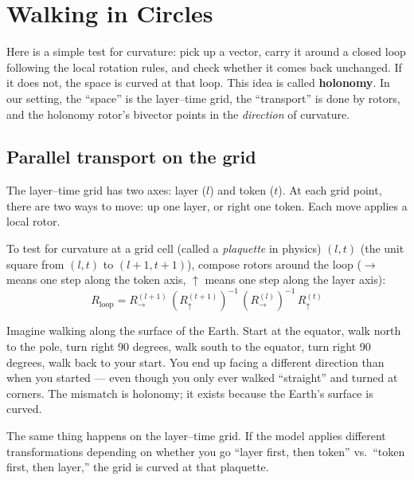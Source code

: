 \documentclass[11pt, twoside, openright]{memoir}
\newcommand{\gp}{\,}              %
\numberwithin{equation}{chapter}
\begin{document}
\chapter{Walking in Circles}
\label{chap:holonomy}

\begin{whycare}
Here is a simple test for curvature: pick up a vector, carry it around a closed loop following the local rotation rules, and check whether it comes back unchanged. If it does not, the space is curved at that loop. This idea is called \textbf{holonomy}.  In our setting, the ``space'' is the
layer--time grid, the ``transport'' is done by rotors, and the holonomy
rotor's bivector points in the \emph{direction} of curvature.
\end{whycare}

\section{Parallel transport on the grid}

The layer--time grid has two axes: layer ($l$) and token ($t$).  At each
grid point, there are two ways to move: up one layer, or right one token.
Each move applies a local rotor.

To test for curvature at a grid cell (called a \emph{plaquette} in physics) $(l, t)$ (the unit square
from $(l,t)$ to $(l+1, t+1)$), compose rotors around the loop ($\rightarrow$ means one step along the token axis, $\uparrow$ means one step along the layer axis):
\begin{equation}
  R_{\text{loop}} = R_{\rightarrow}^{(l+1)} \gp
    (R_{\uparrow}^{(t+1)})^{-1} \gp
    (R_{\rightarrow}^{(l)})^{-1} \gp
    R_{\uparrow}^{(t)}
\end{equation}

\begin{analogy}
Imagine walking along the surface of the Earth.  Start at the equator,
walk north to the pole, turn right 90 degrees, walk south to the
equator, turn right 90 degrees, walk back to your start.  You end up
facing a different direction than when you started --- even though you
only ever walked ``straight'' and turned at corners.  The mismatch is
holonomy; it exists because the Earth's surface is curved.

The same thing happens on the layer--time grid.  If the model applies
different transformations depending on whether you go ``layer first,
then token'' vs.\ ``token first, then layer,'' the grid is curved at
that plaquette.
\end{analogy}
\end{document}
